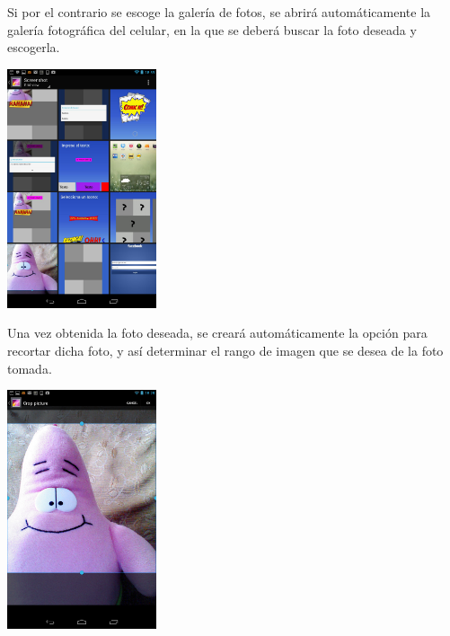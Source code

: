 \documentclass[12pt]{report}
\begin{document}

\newpage
Si por el contrario se escoge la galería de fotos, se abrirá automáticamente la galería fotográfica del celular, en la que se deberá buscar la foto deseada y escogerla.
\newline
	\begin{center}
		\begingroup
			\includegraphics[width=0.33\textwidth]{imagenes_usuario/galeria.png}
		\endgroup
	\end{center}


Una vez obtenida la foto deseada, se creará automáticamente la opción para recortar dicha foto, y así determinar el rango de imagen que se desea de la foto tomada.
\newline
	\begin{center}
		\begingroup
			\includegraphics[width=0.33\textwidth]{imagenes_usuario/crop.png}
		\endgroup
	\end{center}
\end{document}
